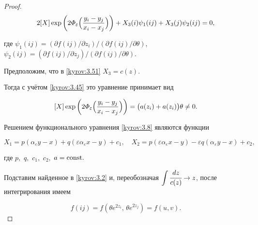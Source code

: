 \begin{proof}
\begin{equation}
 2[X]\exp\left({2\varPhi_{\varepsilon}\Bigl(\frac{y_i-y_j}{x_i-x_j}\Bigr)}\right) +

X_3(i)\psi_1(ij) + X_3(j)\psi_2(ij) = 0,

\end{equation}

где $\psi_1(ij) = (\partial f(ij)/\partial z_i)/(\partial f(ij)/\partial\theta)$, $\psi_2(ij) = (\partial f(ij)/\partial

z_j)/(\partial f(ij)/\partial\theta)$.



Предположим, что в \eqref{kyrov:3.51} $X_3 = c(z)$. 

Тогда с учётом \eqref{kyrov:3.45} это уравнение принимает вид

\begin{equation}

\label{kyrov:3.8}

[X]\exp\left({2\varPhi_{\varepsilon}\Bigl(\frac{y_i-y_j}{x_i-x_j}\Bigr)}\right) =

\bigl(a(z_i) + a(z_i)\bigr)\theta\ne0.

\end{equation}



\begin{lemma}[2]Решением функционального уравнения \eqref{kyrov:3.8} являются функции

$$

 X_1 = p(\alpha_{\varepsilon}y - x) +

q(\varepsilon\alpha_{\varepsilon}x -y)  + c_1,\quad  X_2 =

p(\varepsilon\alpha_{\varepsilon}x -y) - \varepsilon

q(\alpha_{\varepsilon}y - x) + c_2,

$$

где $p,$ $q,$ $c_1,$ $c_2,$ $a = \rm const.$

\end{lemma}





Подставим найденное в \eqref{kyrov:3.2} и, переобозначая $\displaystyle \int\cfrac{dz}{c(z)}\to z$, после интегрирования имеем

\begin{equation}

\label{kyrov:3.9}

f(ij) = f(\theta e^{2z_i},\,\theta e^{2z_j}) = f(u,v).

\end{equation}






\end{proof}
